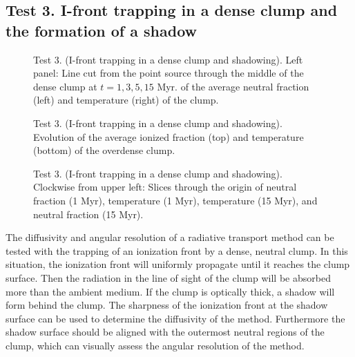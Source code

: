 \documentclass[useAMS,usenatbib]{mn2e}
\begin{document}
\subsection{Test 3. I-front trapping in a dense clump and the
  formation of a shadow}
\label{sec:test3}

\begin{figure*}
  \caption{\label{fig:test3_1} Test 3. (I-front trapping in a dense
    clump and shadowing).  Left panel: Line cut from the point source
    through the middle of the dense clump at $t = 1, 3, 5, 15$ Myr.
    of the average neutral fraction (left) and temperature
    (right) of the clump.}
\end{figure*}

\begin{figure}
  \caption{\label{fig:test3_2} Test 3. (I-front trapping in a dense
    clump and shadowing).  Evolution of the average ionized fraction
    (top) and temperature (bottom) of the overdense clump.}
\end{figure}

\begin{figure*}
  \caption{\label{fig:test3_3} Test 3. (I-front trapping in a dense
    clump and shadowing).  Clockwise from upper left: Slices through
    the origin of neutral fraction (1 Myr), temperature (1 Myr),
    temperature (15 Myr), and neutral fraction (15 Myr).}
\end{figure*}

The diffusivity and angular resolution of a radiative transport method
can be tested with the trapping of an ionization front by a dense,
neutral clump.  In this situation, the ionization front will uniformly
propagate until it reaches the clump surface.  Then the radiation in
the line of sight of the clump will be absorbed more than the ambient
medium.  If the clump is optically thick, a shadow will form behind
the clump.  The sharpness of the ionization front at the shadow
surface can be used to determine the diffusivity of the method.
Furthermore the shadow surface should be aligned with the outermost
neutral regions of the clump, which can visually assess the angular
resolution of the method.
\end{document}
